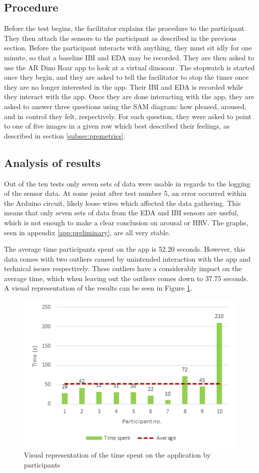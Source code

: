 \subsection{Procedure}
Before the test begins, the facilitator explains the procedure to the participant. They then attach the sensors to the participant as described in the previous section. Before the participant interacts with anything, they must sit idly for one minute, so that a baseline IBI and EDA may be recorded. They are then asked to use the AR Dino Roar app to look at a virtual dinosaur. The stopwatch is started once they begin, and they are asked to tell the facilitator to stop the timer once they are no longer interested in the app. Their IBI and EDA is recorded while they interact with the app. Once they are done interacting with the app, they are asked to answer three questions using the SAM diagram: how pleased, aroused, and in control they felt, respectively. For each question, they were asked to point to one of five images in a given row which best described their feelings, as described in section \ref{subsec:premetrics}.

\subsection{Analysis of results}
Out of the ten tests only seven sets of data were usable in regards to the logging of the sensor data. At some point after test number 5, an error occurred within the Arduino circuit, likely loose wires which affected the data gathering. This means that only seven sets of data from the EDA and IBI sensors are useful, which is not enough to make a clear conclusion on arousal or HRV. The graphs, seen in appendix \ref{app:preliminary}, are all very stable.

The average time participants spent on the app is 52.20 seconds. However, this data comes with two outliers caused by unintended interaction with the app and technical issues respectively. These outliers have a considerably impact on the average time, which when leaving out the outliers comes down to 37.75 seconds. A visual representation of the results can be seen in Figure \ref{fig:time_graph}.

\begin{figure}[h!]
    \centering
    \includegraphics[scale=0.7]{figures/time_graph.png}
    \caption{Visual representation of the time spent on the application by participants}\label{fig:time_graph}
\end{figure}

